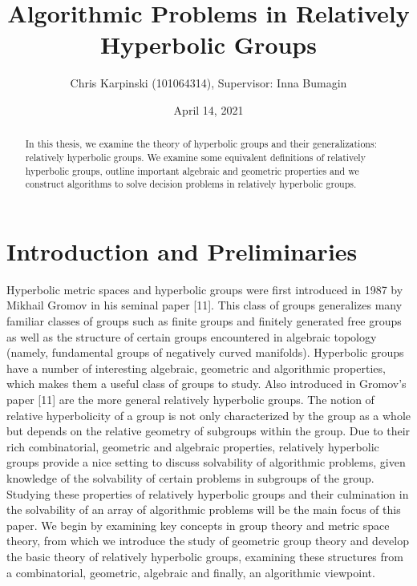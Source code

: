 \documentclass[12pt]{article}
\title{Algorithmic Problems in Relatively Hyperbolic Groups}
\author{Chris Karpinski (101064314), Supervisor: Inna Bumagin}
\date{April 14, 2021}
\begin{document}
	
	\maketitle
	
	\begin{abstract}
		
		In this thesis, we examine the theory of hyperbolic groups and their generalizations: relatively hyperbolic groups. We examine some equivalent definitions of relatively hyperbolic groups, outline important algebraic and geometric properties and we construct algorithms to solve decision problems in relatively hyperbolic groups. 
		
	\end{abstract}
	
	\tableofcontents
	
	
	\newpage
	\section{Introduction and Preliminaries}
	
	Hyperbolic metric spaces and hyperbolic groups were first introduced in 1987 by Mikhail Gromov in his seminal paper [11]. This class of groups generalizes many familiar classes of groups such as finite groups and finitely generated free groups as well as the structure of certain groups encountered in algebraic topology (namely, fundamental groups of negatively curved manifolds). Hyperbolic groups have a number of interesting algebraic, geometric and algorithmic properties, which makes them a useful class of groups to study. Also introduced in Gromov's paper [11] are the more general relatively hyperbolic groups. The notion of relative hyperbolicity of a group is not only characterized by the group as a whole but depends on the relative geometry of subgroups within the group. Due to their rich combinatorial, geometric and algebraic properties, relatively hyperbolic groups provide a nice setting to discuss solvability of algorithmic problems, given knowledge of the solvability of certain problems in subgroups of the group. Studying these properties of relatively hyperbolic groups and their culmination in the solvability of an array of algorithmic problems will be the main focus of this paper. We begin by examining key concepts in group theory and metric space theory, from which we introduce the study of geometric group theory and develop the basic theory of relatively hyperbolic groups, examining these structures from a combinatorial, geometric, algebraic and finally, an algorithmic viewpoint. 
	
\end{document}
